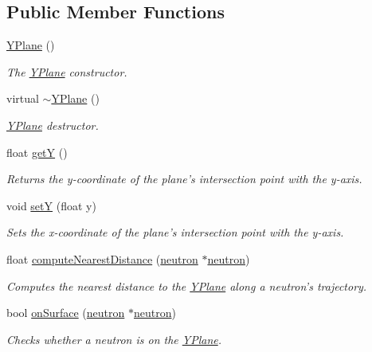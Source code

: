 \subsection*{Public Member Functions}
\begin{DoxyCompactItemize}
\item 
\hyperlink{classYPlane_a3d34dc597f130082af67566a00422f17}{Y\-Plane} ()
\begin{DoxyCompactList}\small\item\em The \hyperlink{classYPlane}{Y\-Plane} constructor. \end{DoxyCompactList}\item 
\hypertarget{classYPlane_a5b76c095cf26194044254f719e92236f}{virtual \hyperlink{classYPlane_a5b76c095cf26194044254f719e92236f}{$\sim$\-Y\-Plane} ()}\label{classYPlane_a5b76c095cf26194044254f719e92236f}

\begin{DoxyCompactList}\small\item\em \hyperlink{classYPlane}{Y\-Plane} destructor. \end{DoxyCompactList}\item 
float \hyperlink{classYPlane_aaba79f83163cc562a3f5e80a3942bc23}{get\-Y} ()
\begin{DoxyCompactList}\small\item\em Returns the y-\/coordinate of the plane's intersection point with the y-\/axis. \end{DoxyCompactList}\item 
void \hyperlink{classYPlane_a3acd886aef57f239f49abdf5004c0df0}{set\-Y} (float y)
\begin{DoxyCompactList}\small\item\em Sets the x-\/coordinate of the plane's intersection point with the y-\/axis. \end{DoxyCompactList}\item 
float \hyperlink{classYPlane_a7f474b38634753235438ca5eff23c2d5}{compute\-Nearest\-Distance} (\hyperlink{structneutron}{neutron} $\ast$\hyperlink{structneutron}{neutron})
\begin{DoxyCompactList}\small\item\em Computes the nearest distance to the \hyperlink{classYPlane}{Y\-Plane} along a neutron's trajectory. \end{DoxyCompactList}\item 
bool \hyperlink{classYPlane_aa8899ff929b56f242316ca684f671772}{on\-Surface} (\hyperlink{structneutron}{neutron} $\ast$\hyperlink{structneutron}{neutron})
\begin{DoxyCompactList}\small\item\em Checks whether a neutron is on the \hyperlink{classYPlane}{Y\-Plane}. \end{DoxyCompactList}\end{DoxyCompactItemize}
